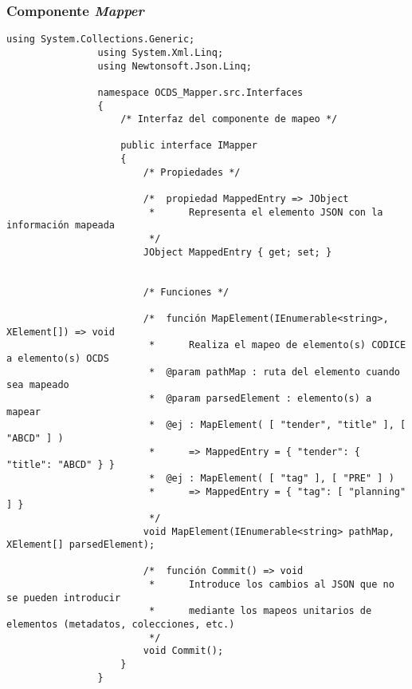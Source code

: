         \subsubsection{Componente \textit{Mapper}}
            \begin{lstlisting}[language=lCSharp]
                using System.Collections.Generic;
                using System.Xml.Linq;
                using Newtonsoft.Json.Linq;
                
                namespace OCDS_Mapper.src.Interfaces
                {
                    /* Interfaz del componente de mapeo */
                
                    public interface IMapper
                    {
                        /* Propiedades */
                
                        /*  propiedad MappedEntry => JObject
                         *      Representa el elemento JSON con la información mapeada
                         */
                        JObject MappedEntry { get; set; }
                
                
                        /* Funciones */
                
                        /*  función MapElement(IEnumerable<string>, XElement[]) => void
                         *      Realiza el mapeo de elemento(s) CODICE a elemento(s) OCDS
                         *  @param pathMap : ruta del elemento cuando sea mapeado
                         *  @param parsedElement : elemento(s) a mapear
                         *  @ej : MapElement( [ "tender", "title" ], [ "ABCD" ] )
                         *      => MappedEntry = { "tender": { "title": "ABCD" } }
                         *  @ej : MapElement( [ "tag" ], [ "PRE" ] )
                         *      => MappedEntry = { "tag": [ "planning" ] }
                         */
                        void MapElement(IEnumerable<string> pathMap, XElement[] parsedElement);
                
                        /*  función Commit() => void
                         *      Introduce los cambios al JSON que no se pueden introducir
                         *      mediante los mapeos unitarios de elementos (metadatos, colecciones, etc.)
                         */
                        void Commit();
                    }
                }
            \end{lstlisting}
\newpage
